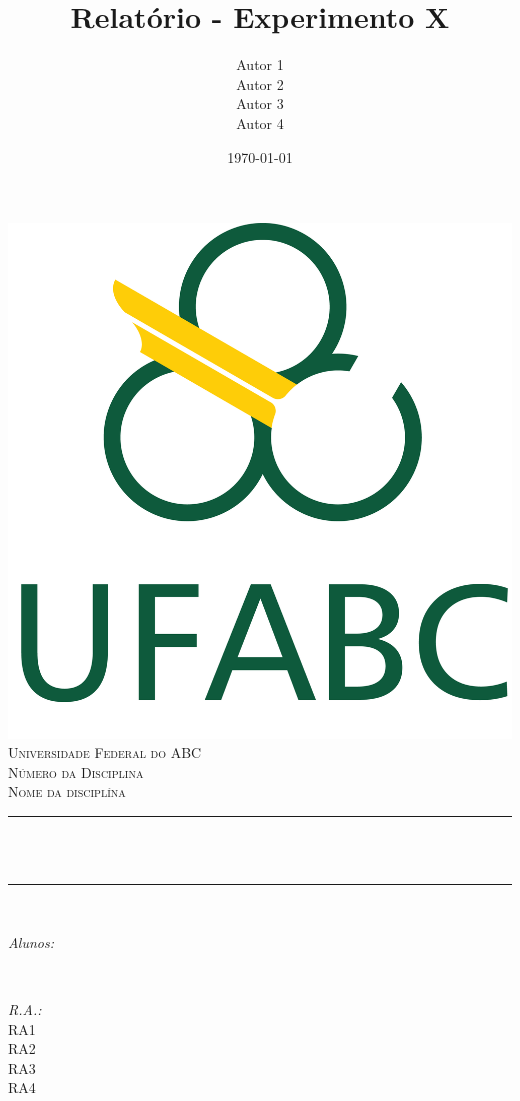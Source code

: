 \documentclass[a4paper, 14pt]{article}
\title{Relatório - Experimento X}					%
\author{Autor 1\\ Autor 2\\Autor 3\\Autor 4}		%
\date{\today}										%
\makeatletter
\let\thetitle\@title
\let\theauthor\@author
\let\thedate\@date
\makeatother
\begin{document}

\begin{titlepage}
	\centering
    \vspace*{0 cm}
    \includegraphics[scale = 0.3]{logo_ufabc.png}\\[1.0 cm]	%
    \textsc{\LARGE Universidade Federal do ABC}\\[2.0 cm]	%
	\textsc{\Large Número da Disciplina}\\[0.5 cm]				%
	\textsc{\large Nome da disciplína}\\[0.5 cm]				%
	\rule{\linewidth}{0.2 mm} \\[0.4 cm]
	{ \huge \bfseries \thetitle}\\
	\rule{\linewidth}{0.2 mm} \\[1.5 cm]
	
	\begin{minipage}{0.4\textwidth}
		\begin{flushleft} \large
			\emph{Alunos: }\\
			\theauthor
			\end{flushleft}
			\end{minipage}~
			\begin{minipage}{0.4\textwidth}
			\begin{flushright} \large
			\emph{R.A.:} \\
			RA1 \\ RA2\\ RA3\\ RA4									%
		\end{flushright}
	\end{minipage}\\[2 cm]
	
	{\large \thedate}\\[2 cm]
 
	\vfill	
\end{titlepage}
\end{document}
